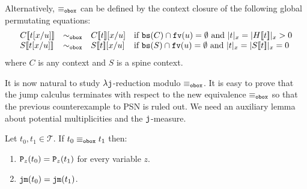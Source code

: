 \documentclass{LMCS}
\renewcommand{\>}{\rightarrow}
\def\lam{\lambda}
\newcommand{\dis}{{\tt j}}
\newcommand{\ldis}{\lam{\dis}}
\newcommand{\fv}[1]{{\tt fv}(#1)}
\newcommand{\mul}[2]{{\tt P}_{#2}(#1)}
\newcommand{\terms}{\mathcal{T}}
\newcommand{\dm}[1]{\dis {\tt m}(#1)}
\newcommand{\jop}{{\tt j}}
\newcommand{\eqw}[1]{\equiv_{#1}}
\newcommand{\fsymb}{\osymb\boite}
\newcommand{\osymb}{{\tt o}}
\newcommand{\eqf}{\eqw{\fsymb}}
\newcommand{\ctx}[2]{#1 [ \! [#2] \! ]}
\newcommand{\bs}[1]{{\tt bs}(#1)}
\newcommand{\boite}{{\tt box}}
\begin{document}
\noindent Alternatively,
  $\eqf$ can be defined by the context closure of the following
  global permutating equations:
\[
\begin{array}{lllll}
\ctx{C}{t[x/u]}&\sim_{\fsymb}& \ctx{C}{t}[x/u] &\mbox{if $\bs{C}\cap \fv{u}=\emptyset$ and $|t|_x=|\ctx{H}{t}|_x>0$}\\
\ctx{S}{t[x/u]}&\sim_{\fsymb}& \ctx{S}{t}[x/u] &\mbox{if $\bs{S}\cap \fv{u}=\emptyset$ and $|t|_x=|\ctx{S}{t}|_x=0$}
\end{array}\]
where $C$ is any context and $S$ is a spine context.\medskip

It is now natural to study $\ldis$-reduction
modulo $\eqf$.  It is easy to prove that the
jump calculus terminates with respect to the
new equivalence $\eqf$ so that the previous counterexample to PSN is
ruled out. We need an auxiliary lemma about potential multiplicities and the $\jop$-measure. 

\begin{lem}
\label{l:mul-for-eq}
Let $t_0,t_1\in \terms$. If  $t_0 \eqf  t_1$ then:
\begin{enumerate}[\rm(1)]
\item $\mul{t_0}{z} = \mul{t_1}{z}$ for every variable $z$.
\item \label{p:mul-for-eq-two} $\dm{t_0} = \dm{t_1}$.
\end{enumerate}
\end{lem}
\end{document}

